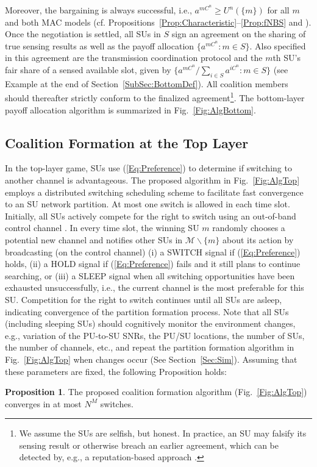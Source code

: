 \documentclass[journal,draftclsnofoot,onecolumn]{IEEEtran}
\theoremstyle{definition}
\newtheorem{Prop}{Proposition}
\begin{document}
Moreover, the bargaining is always successful, i.e., $a^{mC^n}\geq U^n(\{ m\})$ for all $m$ and both MAC models (cf. Propositions~\ref{Prop:Characteristic}--\ref{Prop:fNBS} and \cite{NBSNeg}). Once the negotiation is settled, all SUs in $S$ sign an agreement on the sharing of true sensing results as well as the payoff allocation $\{a^{mC^n}:m\in S\}$. Also specified in this agreement are the transmission coordination protocol and the $m$th SU's fair share of a sensed available slot, given by $\{a^{mC^n}/{\sum_{i\in S}}a^{iC^n}:m\in S\}$ (see Example at the end of Section~\ref{SubSec:BottomDef}). All coalition members should thereafter strictly conform to the finalized agreement\footnote{We assume the SUs are selfish, but honest. In practice, an SU may falsify its sensing result or otherwise breach an earlier agreement, which can be detected  by, e.g., a reputation-based approach \cite{Reputation}.}.  The bottom-layer payoff allocation algorithm is summarized in Fig.~\ref{Fig:AlgBottom}.

\subsection{Coalition Formation at the Top Layer}\label{SubSec:TopSol}
In the top-layer game, SUs use (\ref{Eq:Preference}) to determine if switching to another channel is advantageous. The proposed algorithm in Fig.~\ref{Fig:AlgTop} employs a distributed switching scheduling scheme to facilitate fast convergence to an SU network partition. At most one switch is allowed in each time slot. Initially, all SUs actively compete for the right to switch using an out-of-band control channel \cite{ContrChSurvey}. In every time slot, the winning SU $m$ randomly chooses a potential new channel and notifies other SUs in $\mathcal{M}\backslash \{m\}$ about its action by broadcasting (on the control channel) (i) a SWITCH signal if (\ref{Eq:Preference}) holds, (ii) a HOLD signal if (\ref{Eq:Preference}) fails and it still plans to continue searching, or (iii) a SLEEP signal when all switching opportunities have been exhausted unsuccessfully, i.e., the current channel is the most preferable for this SU. Competition for the right to switch continues until all SUs are asleep, indicating convergence of the partition formation process. Note that all SUs (including sleeping SUs) should cognitively monitor the environment changes, e.g., variation of the PU-to-SU SNRs, the PU/SU locations, the number of SUs, the number of channels, etc., and repeat the partition formation algorithm in Fig.~\ref{Fig:AlgTop} when changes occur (See Section~\ref{Sec:Sim}). Assuming that these parameters are fixed, the following Proposition holds:
\begin{Prop}\label{Prop:Converge} The proposed coalition formation algorithm (Fig.~\ref{Fig:AlgTop}) converges in at most $N^M$ switches.
\end{Prop}
\end{document}
